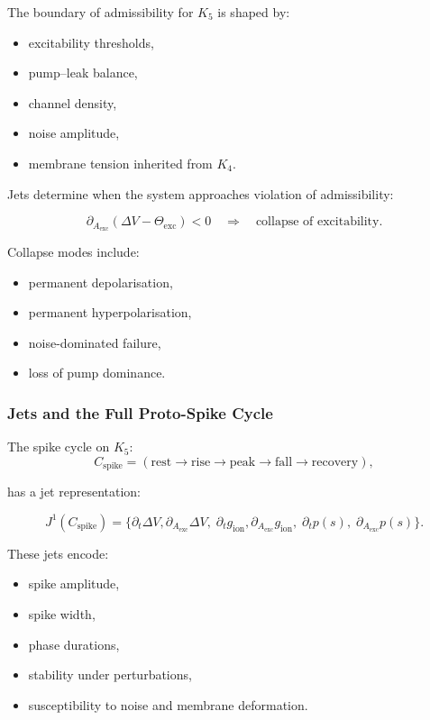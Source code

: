 The boundary of admissibility for $K_5$ is shaped by:

\begin{itemize}
    \item excitability thresholds,
    \item pump–leak balance,
    \item channel density,
    \item noise amplitude,
    \item membrane tension inherited from $K_4$.
\end{itemize}

Jets determine when the system approaches violation of admissibility:

\[
\partial_{A_{\mathrm{exc}}}(\Delta V - \Theta_{\mathrm{exc}}) < 0
\quad\Rightarrow\quad
\text{collapse of excitability}.
\]

Collapse modes include:

\begin{itemize}
    \item permanent depolarisation,
    \item permanent hyperpolarisation,
    \item noise-dominated failure,
    \item loss of pump dominance.
\end{itemize}


\subsubsection{Jets and the Full Proto-Spike Cycle}

The spike cycle on $K_5$:
\[
C_{\mathrm{spike}}=
(\text{rest} \to \text{rise} \to \text{peak} \to \text{fall} \to \text{recovery}),
\]

has a jet representation:

\[
J^1(C_{\mathrm{spike}})=
\{
\partial_t\Delta V,
\partial_{A_{\mathrm{exc}}}\Delta V,\;
\partial_t g_{\mathrm{ion}},
\partial_{A_{\mathrm{exc}}}g_{\mathrm{ion}},\;
\partial_t p(s),\;
\partial_{A_{\mathrm{exc}}}p(s)
\}.
\]

These jets encode:

\begin{itemize}
    \item spike amplitude,
    \item spike width,
    \item phase durations,
    \item stability under perturbations,
    \item susceptibility to noise and membrane deformation.
\end{itemize}


